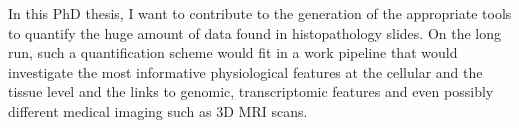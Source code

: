 \documentclass[a4paper,10pt,twocolumn]{article}
\begin{document}

In this PhD thesis, I want to contribute to the generation of the
appropriate tools to quantify the huge amount of data found in
histopathology slides. On the long run, such a
 quantification scheme would fit in a work pipeline that would
 investigate the most informative physiological features at the
 cellular and the tissue level and the links
 to genomic, transcriptomic features and even possibly different
 medical imaging such as 3D MRI scans. 
 

%
\end{document}
